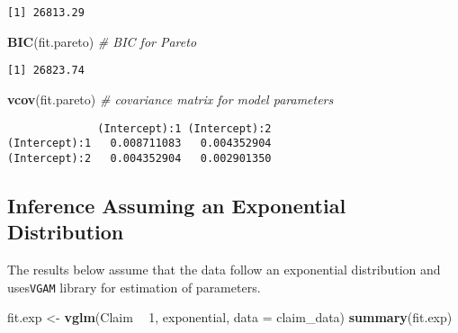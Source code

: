 \documentclass[]{book}
\newenvironment{Shaded}{\begin{snugshade}}{\end{snugshade}}
\newcommand{\KeywordTok}[1]{\textcolor[rgb]{0.13,0.29,0.53}{\textbf{#1}}}
\newcommand{\DataTypeTok}[1]{\textcolor[rgb]{0.13,0.29,0.53}{#1}}
\newcommand{\DecValTok}[1]{\textcolor[rgb]{0.00,0.00,0.81}{#1}}
\newcommand{\StringTok}[1]{\textcolor[rgb]{0.31,0.60,0.02}{#1}}
\newcommand{\CommentTok}[1]{\textcolor[rgb]{0.56,0.35,0.01}{\textit{#1}}}
\newcommand{\OperatorTok}[1]{\textcolor[rgb]{0.81,0.36,0.00}{\textbf{#1}}}
\newcommand{\NormalTok}[1]{#1}
\theoremstyle{definition}
\theoremstyle{definition}
\theoremstyle{definition}
\theoremstyle{remark}
\begin{document}
\begin{verbatim}
[1] 26813.29
\end{verbatim}

\begin{Shaded}
\begin{Highlighting}[]
\KeywordTok{BIC}\NormalTok{(fit.pareto)                    }\CommentTok{# BIC for Pareto}
\end{Highlighting}
\end{Shaded}

\begin{verbatim}
[1] 26823.74
\end{verbatim}

\begin{Shaded}
\begin{Highlighting}[]
\KeywordTok{vcov}\NormalTok{(fit.pareto)                   }\CommentTok{# covariance matrix for model parameters }
\end{Highlighting}
\end{Shaded}

\begin{verbatim}
              (Intercept):1 (Intercept):2
(Intercept):1   0.008711083   0.004352904
(Intercept):2   0.004352904   0.002901350
\end{verbatim}

\subsection{Inference Assuming an Exponential
Distribution}\label{inference-assuming-an-exponential-distribution}

The results below assume that the data follow an exponential
distribution and uses\texttt{VGAM} library for estimation of parameters.

\begin{Shaded}
\begin{Highlighting}[]
\NormalTok{fit.exp <-}\StringTok{ }\KeywordTok{vglm}\NormalTok{(Claim }\OperatorTok{~}\StringTok{ }\DecValTok{1}\NormalTok{, exponential, }\DataTypeTok{data =}\NormalTok{ claim_data)}
\KeywordTok{summary}\NormalTok{(fit.exp)}
\end{Highlighting}
\end{Shaded}
\end{document}
